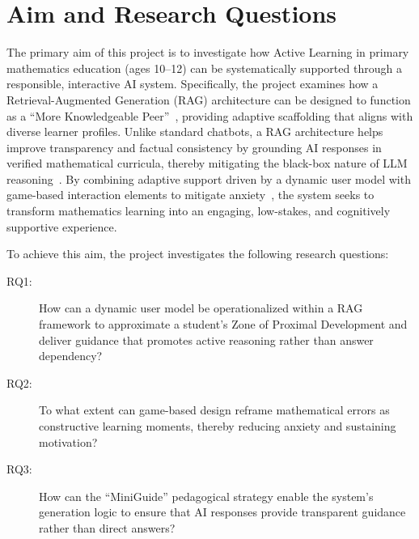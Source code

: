 \section{Aim and Research Questions}


The primary aim of this project is to investigate how Active Learning in primary mathematics education (ages 10--12) can be systematically supported through a responsible, interactive AI system. Specifically, the project examines how a Retrieval-Augmented Generation (RAG) architecture can be designed to function as a \enquote{More Knowledgeable Peer}~\cite{vygotsky1978mind}, providing adaptive scaffolding that aligns with diverse learner profiles. Unlike standard chatbots, a RAG architecture helps improve transparency and factual consistency by grounding AI responses in verified mathematical curricula, thereby mitigating the black-box nature of LLM reasoning~\cite{yu2024rag}. By combining adaptive support driven by a dynamic user model with game-based interaction elements to mitigate anxiety~\cite{lim2012creating}, the system seeks to transform mathematics learning into an engaging, low-stakes, and cognitively supportive experience.


To achieve this aim, the project investigates the following research questions:

\begin{description}

    \item [RQ1:] How can a dynamic user model be operationalized within a RAG framework to approximate a student's Zone of Proximal Development and deliver guidance that promotes active reasoning rather than answer dependency?

    \item [RQ2:] To what extent can game-based design reframe mathematical errors as constructive learning moments, thereby reducing anxiety and sustaining motivation?

    \item [RQ3:] How can the \enquote{MiniGuide} pedagogical strategy enable the system's generation logic to ensure that AI responses provide transparent guidance rather than direct answers?

\end{description}